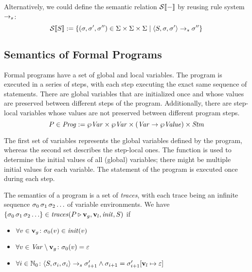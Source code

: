 \documentclass[a4paper,10pt,english]{article}
\begin{document}
Alternatively, we could define the semantic relation $\mathcal{S} \llbracket - \rrbracket$ by reusing rule system $\rightarrow_s$:
\begin{equation*}
	\mathcal{S} \llbracket S \rrbracket := \{ (\sigma, \sigma', \sigma'') \in \Sigma \times \Sigma \times \Sigma \mid \langle S, \sigma,
	\sigma' \rangle \rightarrow_s \sigma'' \}
\end{equation*}

\subsection{Semantics of Formal Programs}

Formal programs have a set of global and local variables. The program is executed in a series of steps, with each step executing
the exact same sequence of statements. There are global variables that are initialized once and whose values are preserved between
different steps of the program. Additionally, there are step-local variables whose values are not preserved between different
program steps.
\begin{equation*}
	P \in \mathit{Prog} := \wp \mathit{Var} \times \wp \mathit{Var} \times (\mathit{Var} \rightarrow \wp \mathit{Value}) \times \mathit{Stm}
\end{equation*}

The first set of variables represents the global variables defined by the program, whereas the second set describes the step-local
ones. The function is used to determine the initial values of all (global) variables; there might be multiple initial
values for each variable. The statement of the program is executed once during each step.

\begin{samepage}
	The semantics of a program is a set of \textit{traces}, with each trace being an infinite sequence $\sigma_0 \,
	\sigma_1 \, \sigma_2 \ldots$ of variable environments. We have $\{ \sigma_0 \, \sigma_1 \, \sigma_2 \ldots \} \in
	\mathit{traces}(P \triangleright \mathbf{v}_g, \mathbf{v}_l, \mathit{init}, S)$ if
	\begin{itemize}
		\item $\forall v \in \mathbf{v}_g \colon \sigma_0(v) \in \mathit{init}(v)$
		\item $\forall v \in \mathit{Var} \setminus \mathbf{v}_g \colon \sigma_0(v) = \varepsilon$
		\item $\forall i \in \mathbb{N}_0 \colon \langle S, \sigma_i, \sigma_i \rangle \rightarrow_s
		\sigma_{i+1}' \wedge \sigma_{i+1} = \sigma_{i + 1}'[\mathbf{v}_l \mapsto \varepsilon]$
	\end{itemize}
\end{samepage}
\end{document}
